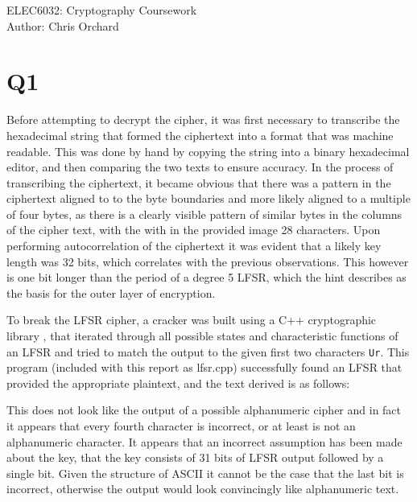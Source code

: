 \documentclass[pdflatex, a4paper,12pt]{article}
\begin{document}
\begin{center}
{\LARGE ELEC6032: Cryptography Coursework}\\[1em]

Author: Chris Orchard\\
\end{center}

\section{Q1}

Before attempting to decrypt the cipher, it was first necessary to transcribe
the hexadecimal string that formed the ciphertext into a format that was machine
readable. This was done by hand by copying the string into a binary hexadecimal
editor, and then comparing the two texts to ensure accuracy. In the process of
transcribing the ciphertext, it became obvious that there was a pattern in the
ciphertext aligned to to the byte boundaries and more likely aligned to a
multiple of four bytes, as there is a clearly visible pattern of similar bytes
in the columns of the cipher text, with the with in the provided image 28
characters. Upon performing autocorrelation of the ciphertext it was evident
that a likely key length was 32 bits, which correlates with the previous
observations. This however is one bit longer than the period of a degree 5 LFSR,
which the hint describes as the basis for the outer layer of encryption.

To break the LFSR cipher, a cracker was built using a C++ cryptographic library
\cite{_cryptographic-c---toolkit_????}, that iterated
through all possible states and characteristic functions of an LFSR and tried to
match the output to the given first two characters \verb+Ur+. This program
(included with this report as lfsr.cpp) successfully found an LFSR that provided
the appropriate plaintext, and the text derived is as follows:

\begin{quote}

\end{quote}

This does not look like the output of a possible alphanumeric cipher and in
fact it appears that every fourth character is incorrect, or at least is not an
alphanumeric character. It appears that an incorrect assumption has been made
about the key, that the key consists of 31 bits of LFSR output followed by a
single bit. Given the structure of ASCII it cannot be the case that the last bit
is incorrect, otherwise the output would look convincingly like alphanumeric text. 
\end{document}
